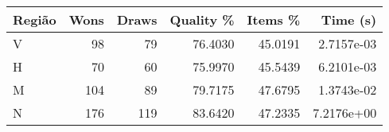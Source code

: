 \begin{tabular}{lrrrrr}
    \hline
    Região & Wons & Draws & Quality \% & Items \% & Time (s)   \\
    \hline
    V      & 98   & 79    & 76.4030    & 45.0191  & 2.7157e-03 \\
    H      & 70   & 60    & 75.9970    & 45.5439  & 6.2101e-03 \\
    M      & 104  & 89    & 79.7175    & 47.6795  & 1.3743e-02 \\
    N      & 176  & 119   & 83.6420    & 47.2335  & 7.2176e+00 \\
    \hline
\end{tabular}